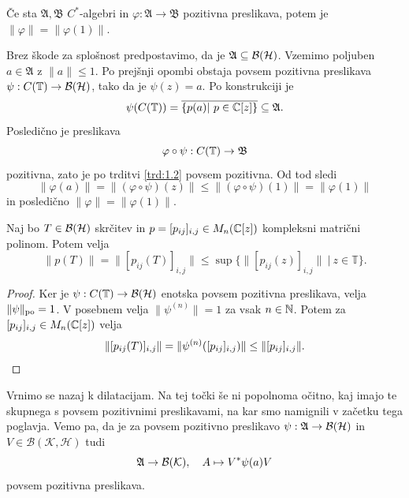 \begin{posledica}\label{pos:russo-dye}
    Če sta $\mathfrak{A}, \mathfrak{B}$ $C^*$-algebri in 
    $\varphi: \mathfrak{A} \to \mathfrak{B}$ pozitivna preslikava, 
    potem je $\| \varphi \| = \| \varphi(1)\|$.
\end{posledica}

\begin{dokaz}
    Brez škode za splošnost predpostavimo, da je $\mathfrak{A} \subseteq \operatorname{\mathcal{B} (\mathcal{H})}$.
    Vzemimo poljuben $a \in \mathfrak{A}$ z $\| a \|\leq 1$. 
    Po prejšnji opombi obstaja povsem pozitivna preslikava $\psi: C(\mathbb T) \to \operatorname{\mathcal{B} (\mathcal{H})}$,
    tako da je $\psi(z) = a$. Po konstrukciji je 
    $$\psi (C(\mathbb T)) = \overline{\{p(a) |\ p \in \mathbb C[z]\}} \subseteq \mathfrak{A}.$$ 
    Posledično je preslikava
    $$\varphi \circ \psi: C(\mathbb T) \to \mathfrak{B}$$ pozitivna, 
    zato je po trditvi \ref{trd:1.2} povsem pozitivna. 
    Od tod sledi 
    $$\| \varphi(a)\| = \| (\varphi \circ \psi) (z)\| \leq \| (\varphi \circ \psi) (1) \| = \| \varphi (1)\|$$
    in posledično $\| \varphi \| = \| \varphi(1)\|$.
\end{dokaz}

\begin{posledica}
    Naj bo $T \in \operatorname{\mathcal{B} (\mathcal{H})}$ skrčitev in $p = [p_{ij}]_{i, j} \in M_n(\mathbb C [z])$ kompleksni matrični polinom. 
    Potem velja
    $$\| p(T)\| = \| [p_{ij} (T)]_{i, j}\| \leq \sup \{\|[p_{ij}(z)]_{i, j}\|\ |\ z \in \mathbb{T}\}.$$
\end{posledica}

\begin{proof}
    Ker je $\psi: C(\mathbb T) \to \operatorname{\mathcal{B} (\mathcal{H})}$ enotska povsem pozitivna preslikava, velja $\| \psi \|_{\operatorname{po}} = 1$.
    V posebnem velja $\| \psi^{(n)} \| =1$ za vsak $n \in \mathbb N$. Potem za $[p_{ij}]_{i, j} \in M_n (\mathbb C [z])$ velja
    \begin{equation*}
        \| [p_{ij} (T)]_{i, j}\| = \| \psi^{(n)} ([p_{ij} ]_{i, j}) \| \leq \| [p_{ij} ]_{i, j} \|. \qedhere
    \end{equation*}
\end{proof}

Vrnimo se nazaj k dilatacijam.
Na tej točki še ni popolnoma očitno, kaj imajo te skupnega s povsem pozitivnimi preslikavami, na kar smo namignili 
v začetku tega poglavja. Vemo pa, da je za povsem pozitivno preslikavo $\psi: \mathfrak{A} \to \operatorname{\mathcal{B} (\mathcal{H})}$ in $V \in \mathcal{B}(\mathcal{K}, \mathcal{H})$ tudi 
\begin{equation}
    \mathfrak{A} \to  \operatorname{\mathcal{B} (\mathcal{K})},\quad A \mapsto V^* \psi (a) V \label{eq:1.1}
\end{equation}
povsem pozitivna preslikava. 

